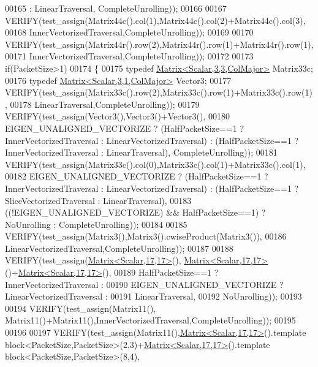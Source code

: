 \begin{DoxyCode}
00165                                 : LinearTraversal, CompleteUnrolling));
00166 
00167     VERIFY(test\_assign(Matrix44c().col(1),Matrix44c().col(2)+Matrix44c().col(3),
00168       InnerVectorizedTraversal,CompleteUnrolling));
00169 
00170     VERIFY(test\_assign(Matrix44r().row(2),Matrix44r().row(1)+Matrix44r().row(1),
00171       InnerVectorizedTraversal,CompleteUnrolling));
00172 
00173     \textcolor{keywordflow}{if}(PacketSize>1)
00174     \{
00175       \textcolor{keyword}{typedef} \hyperlink{group___core___module_class_eigen_1_1_matrix}{Matrix<Scalar,3,3,ColMajor>} Matrix33c;
00176       \textcolor{keyword}{typedef} \hyperlink{group___core___module_class_eigen_1_1_matrix}{Matrix<Scalar,3,1,ColMajor>} Vector3;
00177       VERIFY(test\_assign(Matrix33c().row(2),Matrix33c().row(1)+Matrix33c().row(1),
00178         LinearTraversal,CompleteUnrolling));
00179       VERIFY(test\_assign(Vector3(),Vector3()+Vector3(),
00180         EIGEN\_UNALIGNED\_VECTORIZE ? (HalfPacketSize==1 ? InnerVectorizedTraversal : 
      LinearVectorizedTraversal) : (HalfPacketSize==1 ? InnerVectorizedTraversal : LinearTraversal), CompleteUnrolling));
00181       VERIFY(test\_assign(Matrix33c().col(0),Matrix33c().col(1)+Matrix33c().col(1),
00182         EIGEN\_UNALIGNED\_VECTORIZE ? (HalfPacketSize==1 ? InnerVectorizedTraversal : 
      LinearVectorizedTraversal) : (HalfPacketSize==1 ? SliceVectorizedTraversal : LinearTraversal),
00183         ((!EIGEN\_UNALIGNED\_VECTORIZE) && HalfPacketSize==1) ? NoUnrolling : CompleteUnrolling));
00184 
00185       VERIFY(test\_assign(Matrix3(),Matrix3().cwiseProduct(Matrix3()),
00186         LinearVectorizedTraversal,CompleteUnrolling));
00187 
00188       VERIFY(test\_assign(\hyperlink{group___core___module_class_eigen_1_1_matrix}{Matrix<Scalar,17,17>}(),
      \hyperlink{group___core___module_class_eigen_1_1_matrix}{Matrix<Scalar,17,17>}()+\hyperlink{group___core___module_class_eigen_1_1_matrix}{Matrix<Scalar,17,17>}(),
00189         HalfPacketSize==1             ? InnerVectorizedTraversal  :
00190         EIGEN\_UNALIGNED\_VECTORIZE ? LinearVectorizedTraversal :
00191                                         LinearTraversal,
00192         NoUnrolling));
00193 
00194       VERIFY(test\_assign(Matrix11(), Matrix11()+Matrix11(),InnerVectorizedTraversal,CompleteUnrolling));
00195 
00196 
00197       VERIFY(test\_assign(Matrix11(),\hyperlink{group___core___module_class_eigen_1_1_matrix}{Matrix<Scalar,17,17>}().\textcolor{keyword}{template} 
      block<PacketSize,PacketSize>(2,3)+\hyperlink{group___core___module_class_eigen_1_1_matrix}{Matrix<Scalar,17,17>}().\textcolor{keyword}{template} block<PacketSize,PacketSize>(8,4),

\end{DoxyCode}

